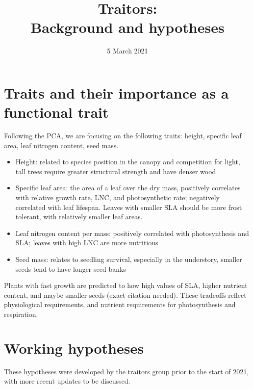 \documentclass{article}\usepackage[]{graphicx}\usepackage[]{color}
\begin{document}
\title{{\huge Traitors:} \\ Background and hypotheses}
\date{5 March 2021}
\maketitle 

\section{Traits and their importance as a functional trait}

Following the PCA, we are focusing on the following traits: height, specific leaf area, leaf nitrogen content, seed mass.
\begin{itemize}
\item Height: related to species position in the canopy and competition for light, tall trees require greater structural strength and have denser wood
\item Specific leaf area: the area of a leaf over the dry mass, positively correlates with relative growth rate, LNC, and photosynthetic rate; negatively correlated with leaf lifespan. Leaves with smaller SLA should be more frost tolerant, with relatively smaller leaf areas.
\item Leaf nitrogen content per mass: positively correlated with photosynthesis and SLA; leaves with high LNC are more nutritious  
\item Seed mass: relates to seedling survival, especially in the understory, smaller seeds tend to have longer seed banks
\end{itemize}

Plants with fast growth are predicted to how high values of SLA, higher nutrient content, and maybe smaller seeds (exact citation needed). These tradeoffs reflect physiological requirements, and nutrient requirements for photosynthesis and respiration. 

\section{Working hypotheses}

These hypotheses were developed by the traitors group prior to the start of 2021, with more recent updates to be discussed. 
\end{document}
